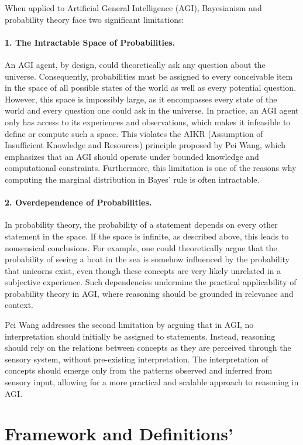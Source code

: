 \documentclass{article}
\begin{document}
When applied to Artificial General Intelligence (AGI), Bayesianism and probability theory face two significant limitations:

\paragraph{1. The Intractable Space of Probabilities.} 
An AGI agent, by design, could theoretically ask any question about the universe. Consequently, probabilities must be assigned to every conceivable item in the space of all possible states of the world as well as every potential question. However, this space is impossibly large, as it encompasses every state of the world and every question one could ask in the universe. In practice, an AGI agent only has access to its experiences and observations, which makes it infeasible to define or compute such a space. This violates the AIKR (Assumption of Insufficient Knowledge and Resources) principle proposed by Pei Wang, which emphasizes that an AGI should operate under bounded knowledge and computational constraints. Furthermore, this limitation is one of the reasons why computing the marginal distribution in Bayes' rule is often intractable.

\paragraph{2. Overdependence of Probabilities.} 
In probability theory, the probability of a statement depends on every other statement in the space. If the space is infinite, as described above, this leads to nonsensical conclusions. For example, one could theoretically argue that the probability of seeing a boat in the sea is somehow influenced by the probability that unicorns exist, even though these concepts are very likely unrelated in a subjective experience. Such dependencies undermine the practical applicability of probability theory in AGI, where reasoning should be grounded in relevance and context.

Pei Wang addresses the second limitation by arguing that in AGI, no interpretation should initially be assigned to statements. Instead, reasoning should rely on the relations between concepts as they are perceived through the sensory system, without pre-existing interpretation. The interpretation of concepts should emerge only from the patterns observed and inferred from sensory input, allowing for a more practical and scalable approach to reasoning in AGI.


\section{Framework and Definitions'}
\end{document}
